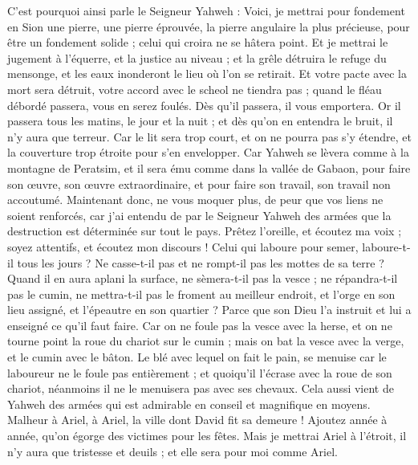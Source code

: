 \begin{multicols}{2}
C'est pourquoi ainsi parle le Seigneur Yahweh : Voici, je mettrai pour fondement en Sion une pierre, une pierre éprouvée, la pierre angulaire la plus précieuse, pour être un fondement solide ; celui qui croira ne se hâtera point.
Et je mettrai le jugement à l'équerre, et la justice au niveau ; et la grêle détruira le refuge du mensonge, et les eaux inonderont le lieu où l'on se retirait.
Et votre pacte avec la mort sera détruit, votre accord avec le scheol ne tiendra pas ; quand le fléau débordé passera, vous en serez foulés.
Dès qu'il passera, il vous emportera. Or il passera tous les matins, le jour et la nuit ; et dès qu'on en entendra le bruit, il n'y aura que terreur.
Car le lit sera trop court, et on ne pourra pas s'y étendre, et la couverture trop étroite pour s'en envelopper.
Car Yahweh se lèvera comme à la montagne de Peratsim, et il sera ému comme dans la vallée de Gabaon, pour faire son œuvre, son œuvre extraordinaire, et pour faire son travail, son travail non accoutumé.
Maintenant donc, ne vous moquer plus, de peur que vos liens ne soient renforcés, car j'ai entendu de par le Seigneur Yahweh des armées que la destruction est déterminée sur tout le pays. 
Prêtez l'oreille, et écoutez ma voix ; soyez attentifs, et écoutez mon discours !
Celui qui laboure pour semer, laboure-t-il tous les jours ? Ne casse-t-il pas et ne rompt-il pas les mottes de sa terre ? 
Quand il en aura aplani la surface, ne sèmera-t-il pas la vesce ; ne répandra-t-il pas le cumin, ne mettra-t-il pas le froment au meilleur endroit, et l'orge en son lieu assigné, et l'épeautre en son quartier ?
Parce que son Dieu l'a instruit et lui a enseigné ce qu'il faut faire.
Car on ne foule pas la vesce avec la herse, et on ne tourne point la roue du chariot sur le cumin ; mais on bat la vesce avec la verge, et le cumin avec le bâton.
Le blé avec lequel on fait le pain, se menuise car le laboureur ne le foule pas entièrement ; et quoiqu'il l'écrase avec la roue de son chariot, néanmoins il ne le menuisera pas avec ses chevaux.
Cela aussi vient de Yahweh des armées qui est admirable en conseil et magnifique en moyens.
\VerseOne{}Malheur à Ariel, à Ariel, la ville dont David fit sa demeure ! Ajoutez année à année, qu'on égorge des victimes pour les fêtes.
Mais je mettrai Ariel à l'étroit, il n'y aura que tristesse et deuils ; et elle sera pour moi comme Ariel.

\end{multicols}
